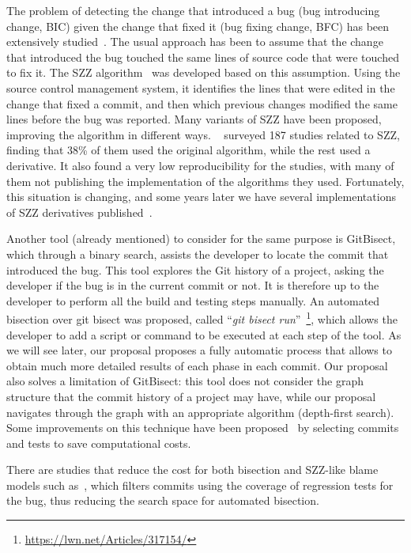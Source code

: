 The problem of detecting the change that introduced a bug (bug introducing change, BIC) given the change that fixed it (bug fixing change, BFC) has been extensively studied~\cite{sinha2010buginnings,davies2014comparing,sliwerski2005changes,kim2006automatic,williams2008szz,kamei2012large,tantithamthavorn2013mining}. The usual approach has been to assume that the change that introduced the bug touched the same lines of source code that were touched to fix it. The SZZ algorithm~\cite{sliwerski2005changes} was developed based on this assumption. Using the source control management system, it identifies the lines that were edited in the change that fixed a commit, and then which previous changes modified the same lines before the bug was reported. Many variants of SZZ have been proposed, improving the algorithm in different ways. \gema~\cite{rodriguez2018reproducibility} surveyed 187 studies related to SZZ, finding that 38\% of them used the original algorithm, while the rest used a derivative. It also found a very low reproducibility for the studies, with many of them not publishing the implementation of the algorithms they used. Fortunately, this situation is changing, and some years later we have several implementations of SZZ derivatives published~\cite{borg2019szz,lenarduzzi2020openszz,pokropinski2022szz,rosa2021evaluating}.

Another tool (already mentioned) to consider for the same purpose is GitBisect, which through a binary search, assists the developer to locate the commit that introduced the bug. This tool explores the Git history of a project, asking the developer if the bug is in the current commit or not. 
It is therefore up to the developer to perform all the build and testing steps manually. 
An automated bisection over git bisect was proposed, called ``\textit{git bisect run}''~\footnote{\url{https://lwn.net/Articles/317154/}}, which allows the developer to add a script or command to be executed at each step of the tool.
As we will see later, our proposal proposes a fully automatic process that allows to obtain much more detailed results of each phase in each commit. 
Our proposal also solves a limitation of GitBisect: this tool does not consider the graph structure that the commit history of a project may have, while our proposal navigates through the graph with an appropriate algorithm (depth-first search).
Some improvements on this technique have been proposed~\cite{saha2017selective} by selecting commits and tests to save computational costs.

There are studies that reduce the cost for both bisection and SZZ-like blame models such as~\cite{an2021reducing}, which filters commits using the coverage of regression tests for the bug, thus reducing the search space for automated bisection.

